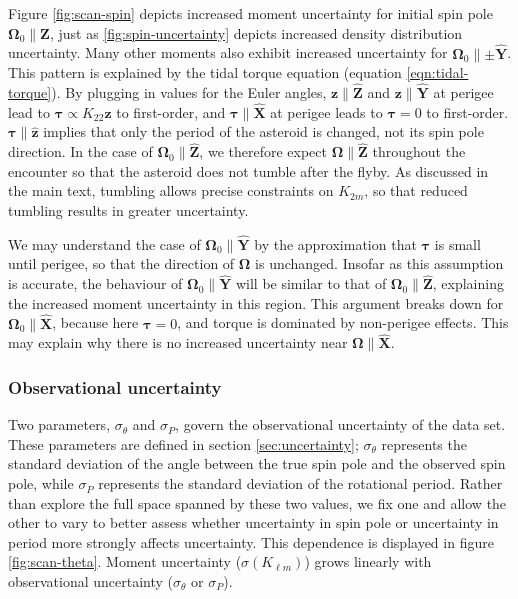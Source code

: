 \documentclass[fleqn,usenatbib]{mnras}
\renewcommand{\unit}[1]{\bm{\hat{#1}}}
\begin{document}
Figure \ref{fig:scan-spin} depicts increased moment uncertainty for initial spin pole $\bm \Omega_0 \parallel \unit Z$, just as \ref{fig:spin-uncertainty} depicts increased density distribution uncertainty. Many other moments also exhibit increased uncertainty for $\bm \Omega_0 \parallel \pm \unit Y$. This pattern is explained by the tidal torque equation (equation \ref{eqn:tidal-torque}). By plugging in values for the Euler angles, $\bm z \parallel \unit Z$ and $\bm z \parallel \unit Y$ at perigee lead to $\bm \tau \propto K_{22} \unit z$ to first-order, and $\bm \tau \parallel \unit X$ at perigee leads to $\bm \tau = 0$ to first-order. $\bm \tau \parallel \unit z$ implies that only the period of the asteroid is changed, not its spin pole direction. In the case of $\bm \Omega_0 \parallel \unit Z$, we therefore expect $\bm \Omega \parallel \unit Z$ throughout the encounter so that the asteroid does not tumble after the flyby. As discussed in the main text, tumbling allows precise constraints on $K_{2m}$, so that reduced tumbling results in greater uncertainty.

We may understand the case of $\bm \Omega_0 \parallel \unit Y$ by the approximation that $\bm \tau$ is small until perigee, so that the direction of $\bm \Omega$ is unchanged. Insofar as this assumption is accurate, the behaviour of $\bm \Omega_0 \parallel \unit Y$ will be similar to that of $\bm \Omega_0 \parallel \unit Z$, explaining the increased moment uncertainty in this region. This argument breaks down for $\bm \Omega_0 \parallel \unit X$, because here $\bm \tau = 0$, and torque is dominated by non-perigee effects. This may explain why there is no increased uncertainty near $\bm \Omega \parallel \unit X$.


\subsubsection{Observational uncertainty}
\label{sec:scan-uncertainty}
Two parameters, $\sigma_\theta$ and $\sigma_P$, govern the observational uncertainty of the data set. These parameters are defined in section \ref{sec:uncertainty}; $\sigma_\theta$ represents the standard deviation of the angle between the true spin pole and the observed spin pole, while $\sigma_P$ represents the standard deviation of the rotational period. Rather than explore the full space spanned by these two values, we fix one and allow the other to vary to better assess whether uncertainty in spin pole or uncertainty in period more strongly affects uncertainty. This dependence is displayed in figure \ref{fig:scan-theta}. Moment uncertainty ($\sigma(K_{\ell m})$) grows linearly with observational uncertainty ($\sigma_\theta$ or $\sigma_P$).
\end{document}

